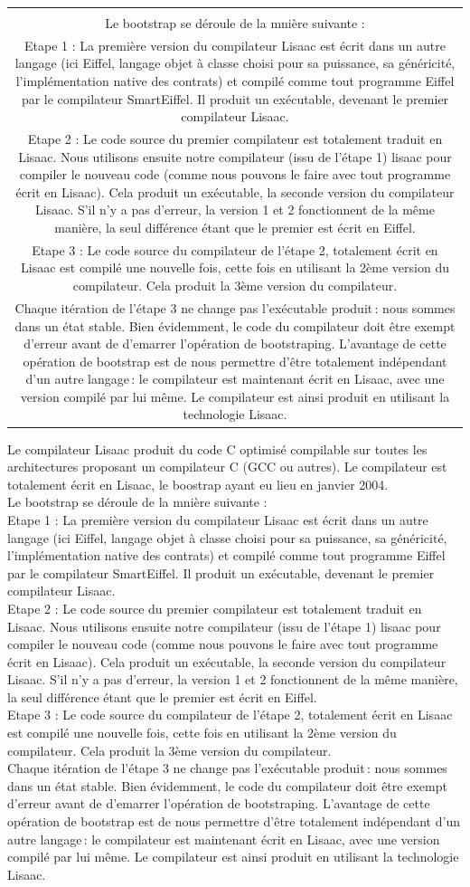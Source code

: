 \documentclass[11pt]{mybook}
\newcommand{\fr}[1]{
  \if \frenchversion 1
    \if \englishversion 1    
    \vspace{2mm}
    \noindent\begin{tabular}{|c}
      {
        \begin{minipage}{15.5cm}
          \textit{#1}
        \end{minipage}
      }
    \end{tabular}
    \else
    #1
    \fi
  \fi
}
\begin{document}
\fr{
Le compilateur Lisaac produit du code C optimis\'e compilable sur toutes les architectures proposant un compilateur C (GCC ou autres).
Le compilateur est totalement \'ecrit en Lisaac, le boostrap ayant eu lieu en janvier 2004.
\\
Le bootstrap se d\'eroule de la mni\`ere suivante :
\\
Etape 1 : La premi\`ere version du compilateur Lisaac est \'ecrit dans un autre langage (ici Eiffel, langage objet à classe choisi 
pour sa puissance, sa g\'en\'ericit\'e, l'impl\'ementation native des contrats) et compil\'e comme tout programme Eiffel 
par le compilateur SmartEiffel.
	Il produit un ex\'ecutable, devenant le premier compilateur Lisaac.
\\
Etape 2 : Le code source du premier compilateur est totalement traduit en Lisaac. Nous utilisons ensuite notre compilateur (issu de l'\'etape 1) lisaac
pour compiler le nouveau code (comme nous pouvons le faire avec tout programme \'ecrit en Lisaac).
Cela produit un ex\'ecutable, la seconde version du compilateur Lisaac. S'il  n'y a pas d'erreur,
la version 1 et 2 fonctionnent de la m\^eme mani\`ere, la seul diff\'erence \'etant que le premier est \'ecrit en Eiffel.
\\
Etape 3 : Le code source du compilateur de l'\'etape 2, totalement \'ecrit en Lisaac est compil\'e une nouvelle fois, 
cette fois en utilisant la 2\`eme version du compilateur. Cela produit la 3\`eme version du compilateur. 
\\
Chaque it\'eration de l'\'etape 3 ne change pas l'ex\'ecutable produit\,: nous sommes dans un \'etat stable.
Bien \'evidemment, le code du compilateur doit \^etre exempt d'erreur avant de d'emarrer l'op\'eration de bootstraping.
L'avantage de cette op\'eration de bootstrap est de nous permettre d'\^etre totalement ind\'ependant d'un autre langage\,: 
le compilateur est maintenant \'ecrit en Lisaac, avec une version compil\'e par lui m\^eme.
Le compilateur est ainsi produit en utilisant la technologie Lisaac.
}
\end{document}
